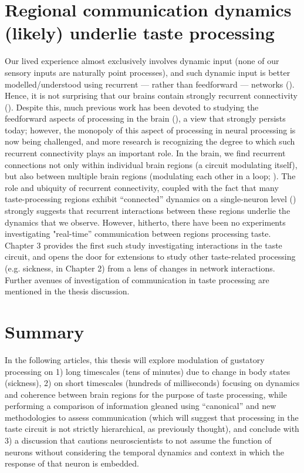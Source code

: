 \begin{refsection}
\section{Regional communication dynamics (likely) underlie taste processing}
Our lived experience almost exclusively involves dynamic input (none of our sensory inputs are naturally point processes), and such dynamic input is better modelled/understood using recurrent --- rather than feedforward --- networks (\cite{kietzmann2019a,alamia2020a}). Hence, it is not surprising that our brains contain strongly recurrent connectivity (\cite{rigotti2010a,bergen2020a,matsumoto2022a}). 
Despite this, much previous work has been devoted to studying the feedforward aspects of processing in the brain (\cite{carleton2010a,heidari-gorji2021a}), a view that strongly persists today; however, the monopoly of this aspect of processing in neural processing is now being challenged, and more research is recognizing the degree to which such recurrent connectivity plays an important role. In the brain, we find recurrent connections not only within individual brain regions (a circuit modulating itself), but also between multiple brain regions (modulating each other in a loop; \cite{mante2013a,hart2020a,kotekal2020a}).
The role and ubiquity of recurrent connectivity, coupled with the fact that many taste-processing regions exhibit “connected” dynamics on a single-neuron level (\cite{grossman2008a,fontanini2009a,jezzini2013a,li2013a,baez-santiago2016a}) strongly suggests that recurrent interactions between these regions underlie the dynamics that we observe. However, hitherto, there have been no experiments investigating "real-time” communication between regions processing taste. Chapter 3 provides the first such study investigating interactions in the taste circuit, and opens the door for extensions to study other taste-related processing (e.g. sickness, in Chapter 2) from a lens of changes in network interactions. Further avenues of investigation of communication in taste processing are mentioned in the thesis discussion.

\section{Summary}
In the following articles, this thesis will explore modulation of gustatory processing on 1) long timescales (tens of minutes) due to change in body states (sickness), 2) on short timescales (hundreds of milliseconds) focusing on dynamics and coherence between brain regions for the purpose of taste processing, while performing a comparison of information gleaned using “canonical” and new methodologies to assess communication (which will suggest that processing in the taste circuit is not strictly hierarchical, as previously thought), and conclude with 3) a discussion that cautions neuroscientists to not assume the function of neurons without considering the temporal dynamics and context in which the response of that neuron is embedded.

\printbibliography[title={References}]
\end{refsection}